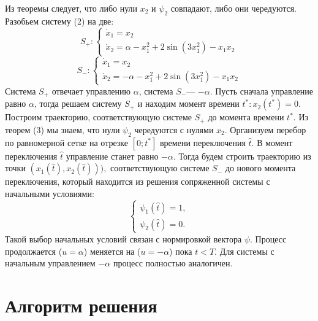 \documentclass[11pt]{article}
\begin{document}
 	{Из теоремы следует, что либо нули $x_2$ и $\psi_2$ совпадают, либо они чередуются. Разобьем систему (2) на две:}
 	\begin{equation}
 		S_+ : \begin{cases}
 		\dot{x}_1 = x_2\\
 		\dot{x}_2 =  \alpha - x_1^2 + 2\sin(3x_1^2) - x_1 x_2
 		\end{cases}
 	\end{equation}
 	\begin{equation}
 		S_- : \begin{cases}
 		\dot{x}_1 = x_2\\
 		\dot{x}_2 =  -\alpha - x_1^2 + 2\sin(3x_1^2) - x_1 x_2
 		\end{cases}
 	\end{equation}
 	{Система $S_+$ отвечает управлению $\alpha$, система $S_-$--- $-\alpha.$ }
 	\newline
 	{Пусть сначала управление равно $\alpha$, тогда решаем систему $S_+$ и находим момент времени $t^*:x_2(t^*)=0.$ Построим траекторию, соответствующую системе $S_+$ до момента времени $t^*$. Из теорем (3) мы знаем, что нули $\psi_2$ чередуются с нулями $x_2$. Организуем перебор по равномерной сетке на отрезке $[0; t^*]$ времени переключения $\hat{t}$. В момент переключения $\hat{t}$ управление станет равно $-\alpha.$ Тогда будем строить траекторию из точки $(x_1(\hat{t}),x_2(\hat{t}))),$ соответствующую системе $S_-$ до нового момента переключения, который находится из решения сопряженной системы с начальными условиями:}
 	\begin{equation}
 	\begin{cases}
  	\psi_1(\hat{t}) = 1,\\
 	\psi_2(\hat{t}) = 0.
 	\end{cases}
 	\end{equation}
 	{Такой выбор начальных условий связан с нормировкой вектора $\psi$. Процесс продолжается ($u = \alpha$) меняется на ($u = -\alpha$) пока $t < T.$ Для системы с начальным управлением $-\alpha$ процесс полностью аналогичен.}
 	{\section{Алгоритм решения}}
\end{document}
